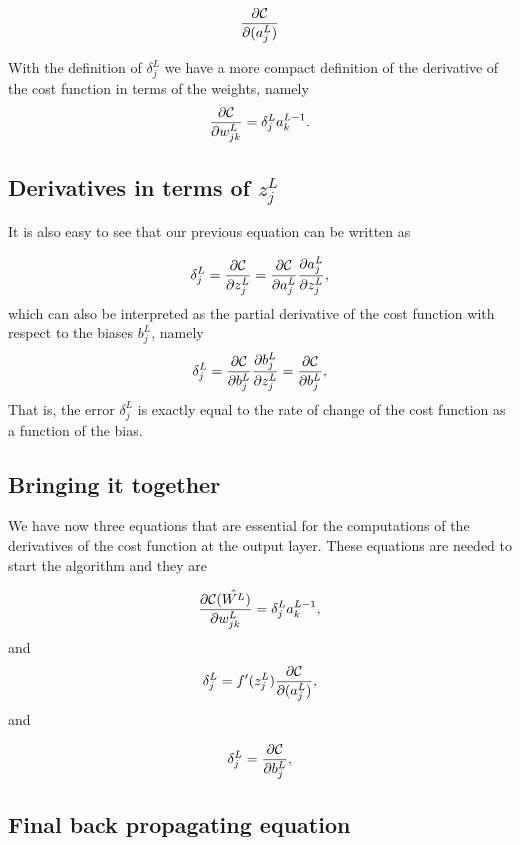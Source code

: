 \documentclass[%
oneside,                 %
final,                   %
10pt]{article}
\begin{document}
\[
\frac{\partial {\cal C}}{\partial (a_j^L)}
\]

With the definition of $\delta_j^L$ we have a more compact definition of the derivative of the cost function in terms of the weights, namely
\[
\frac{\partial{\cal C}}{\partial w_{jk}^L}  =  \delta_j^La_k^{L-1}.
\]

\subsection{Derivatives in terms of $z_j^L$}

It is also easy to see that our previous equation can be written as

\[
\delta_j^L =\frac{\partial {\cal C}}{\partial z_j^L}= \frac{\partial {\cal C}}{\partial a_j^L}\frac{\partial a_j^L}{\partial z_j^L},
\]
which can also be interpreted as the partial derivative of the cost function with respect to the biases $b_j^L$, namely
\[
\delta_j^L = \frac{\partial {\cal C}}{\partial b_j^L}\frac{\partial b_j^L}{\partial z_j^L}=\frac{\partial {\cal C}}{\partial b_j^L},
\]
That is, the error $\delta_j^L$ is exactly equal to the rate of change of the cost function as a function of the bias. 

\subsection{Bringing it together}

We have now three equations that are essential for the computations of the derivatives of the cost function at the output layer. These equations are needed to start the algorithm and they are

\begin{equation}
\frac{\partial{\cal C}(\hat{W^L})}{\partial w_{jk}^L}  =  \delta_j^La_k^{L-1},
\end{equation}
and
\begin{equation}
\delta_j^L = f'(z_j^L)\frac{\partial {\cal C}}{\partial (a_j^L)},
\end{equation}
and

\begin{equation}
\delta_j^L = \frac{\partial {\cal C}}{\partial b_j^L},
\end{equation}

\subsection{Final back propagating equation}
\end{document}
